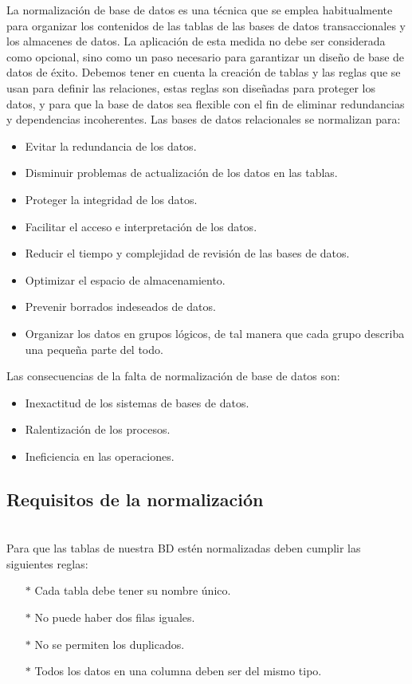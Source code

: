 \documentclass[spanish]{article}
\begin{document}
La normalización de base de datos es una técnica que se emplea habitualmente para organizar los contenidos de las tablas de las bases de datos transaccionales y los almacenes de datos. La aplicación de esta medida no debe ser considerada como opcional, sino como un paso necesario para garantizar un diseño de base de datos de éxito. Debemos tener en cuenta la creación de tablas y las reglas que se usan para definir las relaciones, estas reglas son diseñadas para proteger los datos, y para que la base de datos sea flexible con el fin de eliminar redundancias y dependencias incoherentes.
    Las bases de datos relacionales se normalizan para:
    \begin{itemize}
        \item Evitar la redundancia de los datos.
        \item Disminuir problemas de actualización de los datos en las tablas.
        \item Proteger la integridad de los datos.
        \item Facilitar el acceso e interpretación de los datos.
        \item Reducir el tiempo y complejidad de revisión de las bases de datos.
        \item Optimizar el espacio de almacenamiento.
        \item Prevenir borrados indeseados de datos.
        \item Organizar los datos en grupos lógicos, de tal manera que cada grupo describa una pequeña parte del todo.
    \end{itemize}
    Las consecuencias de la falta de normalización de base de datos son:
    \begin{itemize}
        \item Inexactitud de los sistemas de bases de datos.
        \item Ralentización de los procesos.
        \item Ineficiencia en las operaciones.
    \end{itemize}
    
\subsection{Requisitos de la normalización}\\

Para que las tablas de nuestra BD estén normalizadas deben cumplir las siguientes reglas:
    \begin{itemize}
        \item[$*$] Cada tabla debe tener su nombre único.
         \item[$*$]	No puede haber dos filas iguales.
         \item[$*$]	No se permiten los duplicados.
         \item[$*$]	Todos los datos en una columna deben ser del mismo tipo.
         
    \end{itemize} 
\end{document}
